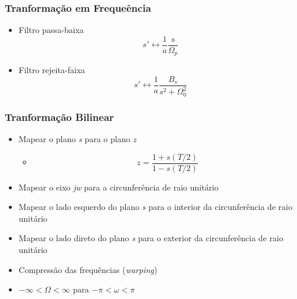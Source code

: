 \documentclass{beamer}
\begin{document}
\subsubsection{Tranforma\c{c}\~ao em Freque\^encia}
	\begin{frame}
		\begin{itemize}
		 \item Filtro passa-baixa
			  \begin{equation}
			  s' \leftrightarrow \frac{1}{a} \frac{s}{\Omega_{p}}
			  \end{equation}
		 \item Filtro rejeita-faixa
			  \begin{equation}
			  s' \leftrightarrow \frac{1}{a} \frac{B_{s}}{s^{2} + \Omega_{0}^{2}}
			  \end{equation}
		\end{itemize}

	\end{frame}
	
\subsubsection{Tranforma\c{c}\~ao Bilinear}

	\begin{frame}
		\begin{itemize}
			\item Mapear o plano \textit{s} para o plano \textit{z}
				\begin{itemize}
				\item  		\[z = \frac{1+s(T/2)}{1-s(T/2)}\]
				\end{itemize}
			\item Mapear o eixo \textit{jw} para a circunfer\^encia de raio unit\'ario
			\item Mapear o lado esquerdo do plano \textit{s} para o interior da circunfer\^encia de raio unit\'ario
			\item Mapear o lado direto do plano \textit{s} para o exterior da circunfer\^encia de raio unit\'ario
			\item Compress\~ao das frequ\^encias (\textit{warping})
			\item \(-\infty < \Omega < \infty\) para \(-\pi < \omega < \pi\)
		\end{itemize}

	\end{frame}
	
\end{document}
